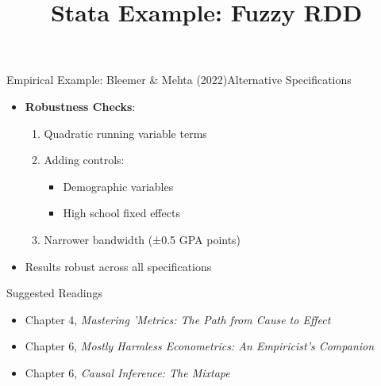 \documentclass[dvipsnames,hyperref={pdfpagelabels=false}]{beamer}
\begin{document}
\begin{frame}{Empirical Example: Bleemer \& Mehta (2022)}{Alternative Specifications}
	\begin{itemize}
	
		\item \textbf{Robustness Checks}:
		\begin{enumerate}
			\item Quadratic running variable terms
			\item Adding controls:
			\begin{itemize}
				\item Demographic variables
				\item High school fixed effects
			\end{itemize}
			\item Narrower bandwidth (±0.5 GPA points)
		\end{enumerate}
		
		\vspace{0.2cm}
		\item Results robust across all specifications
	\end{itemize}
\end{frame}


\begin{frame}{Suggested Readings} %
	\begin{itemize} 
		\item Chapter 4, \textit{Mastering 'Metrics: The Path from Cause to Effect}
		\vspace{0.2cm}
		\item Chapter 6, \textit{Mostly Harmless Econometrics: An Empiricist's Companion} %
		\vspace{0.2cm}
		\item Chapter 6, \textit{Causal Inference: The Mixtape}
	\end{itemize}
\end{frame}






\title[]
{Stata Example: Fuzzy RDD}
\end{document}
